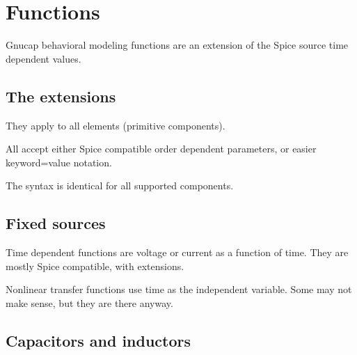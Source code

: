 %
%
%
%
\section{Functions}

Gnucap behavioral modeling functions are an extension of the Spice source
time dependent values.
\subsection{The extensions}

They apply to all elements (primitive components).

All accept either Spice compatible order dependent parameters, or
easier keyword=value notation.

The syntax is identical for all supported components.
\subsection{Fixed sources}

Time dependent functions are voltage or current as a function of time.
They are mostly Spice compatible, with extensions.

Nonlinear transfer functions use time as the independent variable.
Some may not make sense, but they are there anyway.
\subsection{Capacitors and inductors}

